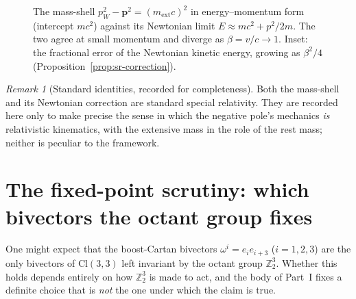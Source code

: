 \documentclass[11pt,oneside]{book}
\newcommand{\Cl}{\mathrm{Cl}}                     %
\newcommand{\Zt}{\mathbb{Z}_2}
\theoremstyle{plain}
\theoremstyle{definition}
\theoremstyle{remark}
\newtheorem{remark}[theorem]{Remark}
\begin{document}
\begin{figure}[t]
\centering
{}
\caption{The mass-shell $p_W^2-\mathbf p^2=(m_{\mathrm{ext}}c)^2$ in energy--momentum
form (intercept $mc^2$) against its Newtonian limit $E\approx mc^2+p^2/2m$. The two
agree at small momentum and diverge as $\beta=v/c\to1$. Inset: the fractional error of
the Newtonian kinetic energy, growing as $\beta^2/4$
(Proposition~\ref{prop:sr-correction}).}
\label{fig:massshell-sr}
\end{figure}

\begin{remark}[Standard identities, recorded for completeness]
Both the mass-shell and its Newtonian correction are standard special relativity. They
are recorded here only to make precise the sense in which the negative pole's mechanics
\emph{is} relativistic kinematics, with the extensive mass in the role of the rest
mass; neither is peculiar to the framework.
\end{remark}

\section{The fixed-point scrutiny: which bivectors the octant group fixes}
\label{sec:fixedpoint-scrutiny}
One might expect that the boost-Cartan bivectors $\omega^i=e_ie_{i+3}$ ($i=1,2,3$) are the only
bivectors of $\Cl(3,3)$ left invariant by the octant group $\Zt^{3}$. Whether this holds
depends entirely on how $\Zt^{3}$ is made to act, and the body of Part~I fixes a definite
choice that is \emph{not} the one under which the claim is true.
\end{document}
